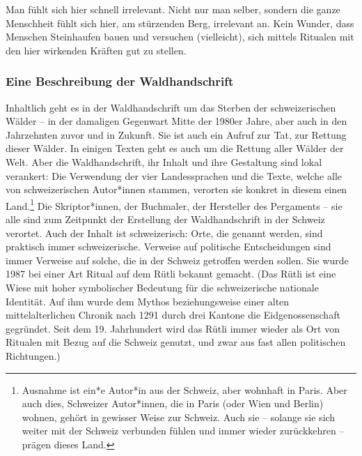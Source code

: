 \documentclass[a4paper,
fontsize=11pt,
oneside,
numbers=noperiodatend,
parskip=half-,
bibliography=totoc,
final
]{scrartcl}
\begin{document}
Man fühlt sich hier schnell irrelevant. Nicht nur man selber, sondern
die ganze Menschheit fühlt sich hier, am stürzenden Berg, irrelevant an.
Kein Wunder, dass Menschen Steinhaufen bauen und versuchen (vielleicht),
sich mittels Ritualen mit den hier wirkenden Kräften gut zu stellen.

\subsubsection{Eine Beschreibung der
Waldhandschrift}\label{eine-beschreibung-der-waldhandschrift}

Inhaltlich geht es in der Waldhandschrift um das Sterben der
schweizerischen Wälder -- in der damaligen Gegenwart Mitte der 1980er
Jahre, aber auch in den Jahrzehnten zuvor und in Zukunft. Sie ist auch
ein Aufruf zur Tat, zur Rettung dieser Wälder. In einigen Texten geht es
auch um die Rettung aller Wälder der Welt. Aber die Waldhandschrift, ihr
Inhalt und ihre Gestaltung sind lokal verankert: Die Verwendung der vier
Landessprachen und die Texte, welche alle von schweizerischen
Autor*innen stammen, verorten sie konkret in diesem einen
Land.\footnote{Ausnahme ist ein*e Autor*in aus der Schweiz, aber
  wohnhaft in Paris. Aber auch dies, Schweizer Autor*innen, die in Paris
  (oder Wien und Berlin) wohnen, gehört in gewisser Weise zur Schweiz.
  Auch sie -- solange sie sich weiter mit der Schweiz verbunden fühlen
  und immer wieder zurückkehren -- prägen dieses Land.} Die
Skriptor*innen, der Buchmaler, der Hersteller des Pergaments -- sie alle
sind zum Zeitpunkt der Erstellung der Waldhandschrift in der Schweiz
verortet. Auch der Inhalt ist schweizerisch: Orte, die genannt werden,
sind praktisch immer schweizerische. Verweise auf politische
Entscheidungen sind immer Verweise auf solche, die in der Schweiz
getroffen werden sollen. Sie wurde 1987 bei einer Art Ritual auf dem
Rütli bekannt gemacht. (Das Rütli ist eine Wiese mit hoher symbolischer
Bedeutung für die schweizerische nationale Identität. Auf ihm wurde dem
Mythos beziehungsweise einer alten mittelalterlichen Chronik nach 1291
durch drei Kantone die Eidgenossenschaft gegründet. Seit dem 19.
Jahrhundert wird das Rütli immer wieder als Ort von Ritualen mit Bezug
auf die Schweiz genutzt, und zwar aus fast allen politischen
Richtungen.)
\end{document}
